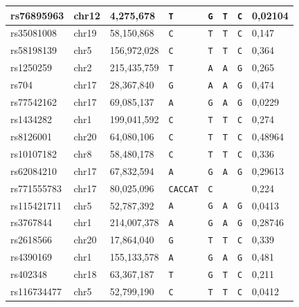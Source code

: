 \documentclass[a4paper, titlepage, openright]{book}
\begin{document}
\begin{table}[!]
{\begin{tabular}{|l|l|l|l|l|l|l|l|}
        rs76895963  & chr12 & 4,275,678   & \texttt{T}      & \texttt{G} & \texttt{T} & \texttt{C} & 0,02104 \\ \hline
        rs35081008  & chr19 & 58,150,868  & \texttt{C}      & \texttt{T} & \texttt{T} & \texttt{C} & 0,147   \\ \hline
        rs58198139  & chr5  & 156,972,028 & \texttt{C}      & \texttt{T} & \texttt{T} & \texttt{C} & 0,364   \\ \hline
        rs1250259   & chr2  & 215,435,759 & \texttt{T}      & \texttt{A} & \texttt{A} & \texttt{G} & 0,265   \\ \hline
        rs704       & chr17 & 28,367,840  & \texttt{G}      & \texttt{A} & \texttt{A} & \texttt{G} & 0,474   \\ \hline
        rs77542162  & chr17 & 69,085,137  & \texttt{A}      & \texttt{G} & \texttt{A} & \texttt{G} & 0,0229  \\ \hline
        rs1434282   & chr1  & 199,041,592 & \texttt{C}      & \texttt{T} & \texttt{T} & \texttt{C} & 0,274   \\ \hline
        rs8126001   & chr20 & 64,080,106  & \texttt{C}      & \texttt{T} & \texttt{T} & \texttt{C} & 0,48964 \\ \hline
        rs10107182  & chr8  & 58,480,178  & \texttt{C}      & \texttt{T} & \texttt{T} & \texttt{C} & 0,336   \\ \hline
        rs62084210  & chr17 & 67,832,594  & \texttt{A}      & \texttt{G} & \texttt{A} & \texttt{G} & 0,29613 \\ \hline
        rs771555783 & chr17 & 80,025,096  & \texttt{CACCAT} & \texttt{C} &   &   & 0,224   \\ \hline
        rs115421711 & chr5  & 52,787,392  & \texttt{A}      & \texttt{G} & \texttt{A} & \texttt{G} & 0,0413  \\ \hline
        rs3767844   & chr1  & 214,007,378 & \texttt{A}      & \texttt{G} & \texttt{A} & \texttt{G} & 0,28746 \\ \hline
        rs2618566   & chr20 & 17,864,040  & \texttt{G}      & \texttt{T} & \texttt{T} & \texttt{C} & 0,339   \\ \hline
        rs4390169   & chr1  & 155,133,578 & \texttt{A}      & \texttt{G} & \texttt{A} & \texttt{G} & 0,481   \\ \hline
        rs402348    & chr18 & 63,367,187  & \texttt{T}      & \texttt{G} & \texttt{T} & \texttt{C} & 0,211   \\ \hline
        rs116734477 & chr5  & 52,799,190  & \texttt{C}      & \texttt{T} & \texttt{T} & \texttt{C} & 0,0412  \\ \hline

\end{tabular}}
\end{table}
\end{document}
